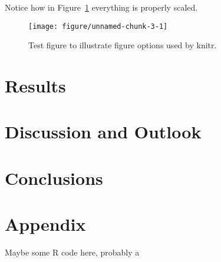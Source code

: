 \documentclass[11pt,a4paper,twoside]{book}\usepackage[]{graphicx}\usepackage[]{color}
\makeatletter
\def\maxwidth{ %
  \ifdim\Gin@nat@width>\linewidth
    \linewidth
  \else
    \Gin@nat@width
  \fi
}
\newenvironment{knitrout}{}{} %
\makeatother
\begin{document}
\bigskip 

Notice how in Figure~\ref{f02:1} everything is properly scaled.   

\begin{figure}
\begin{knitrout}
\color{fgcolor}
\texttt{[image: figure/unnamed-chunk-3-1]} 

\end{knitrout}
  \caption{Test figure to illustrate figure options used by knitr.}
  \label{f02:1}
\end{figure}





\chapter{Results}





\chapter{Discussion and Outlook}






\chapter{Conclusions}


\appendix




\chapter{Appendix}

Maybe some R code here, probably a 




\cleardoublepage
{}
{}


 


\cleardoublepage
\end{document}
